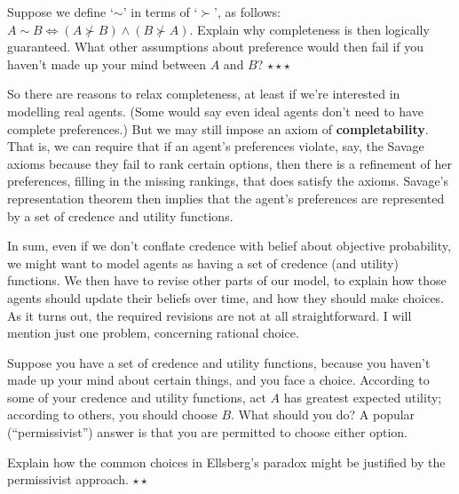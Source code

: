 \begin{exercise}
  Suppose we define `$\sim$' in terms of `$\succ$', as follows: $A\sim
  B \Leftrightarrow (A \not\succ B) \land (B \not\succ A)$. Explain
  why completeness is then logically guaranteed. What other
  assumptions about preference would then fail if you haven't made up
  your mind between $A$ and $B$? $\star\star\star$
\end{exercise}



So there are reasons to relax completeness, at least if we're
interested in modelling real agents. (Some would say even ideal
agents don't need to have complete preferences.) But we may still
impose an axiom of \textbf{completability}. That is, we can require
that if an agent's preferences violate, say, the Savage axioms because
they fail to rank certain options, then there is a refinement of her
preferences, filling in the missing rankings, that does satisfy the
axioms. Savage's representation theorem then implies that the agent's
preferences are represented by a set of credence and utility
functions.

In sum, even if we don't conflate credence with belief about objective
probability, we might want to model agents as having a set of credence
(and utility) functions. We then have to revise other parts of our
model, to explain how those agents should update their beliefs over
time, and how they should make choices. As it turns out, the required
revisions are not at all straightforward. I will mention just one
problem, concerning rational choice. 

Suppose you have a set of credence and utility functions, because you
haven't made up your mind about certain things, and you face a
choice. According to some of your credence and utility functions, act
$A$ has greatest expected utility; according to others, you should
choose $B$. What should you do? A popular (``permissivist'') answer is that you are
permitted to choose either option.

\begin{exercise}
  Explain how the common choices in Ellsberg's paradox might be
  justified by the permissivist approach. $\star\star$
\end{exercise}

